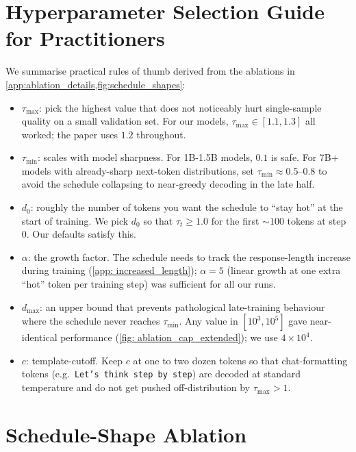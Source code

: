 {\section{Hyperparameter Selection Guide for Practitioners}
\label{sec:hp_guide}
We summarise practical rules of thumb derived from the ablations in
\cref{app:ablation_details,fig:schedule_shapes}:
\begin{itemize}
\item \textbf{$\tau_{\max}$}: pick the highest value that does not noticeably hurt single-sample quality on a small validation set. For our models, $\tau_{\max} \in [1.1, 1.3]$ all worked; the paper uses $1.2$ throughout.
\item \textbf{$\tau_{\min}$}: scales with model sharpness. For 1B-1.5B models, $0.1$ is safe. For 7B+ models with already-sharp next-token distributions, set $\tau_{\min} \approx 0.5\text{--}0.8$ to avoid the schedule collapsing to near-greedy decoding in the late half.
\item \textbf{$d_0$}: roughly the number of tokens you want the schedule to ``stay hot'' at the start of training. We pick $d_0$ so that $\tau_t \geq 1.0$ for the first $\sim 100$ tokens at step 0. Our defaults satisfy this.
\item \textbf{$\alpha$}: the growth factor. The schedule needs to track the response-length increase during training (\cref{app: increased_length}); $\alpha = 5$ (linear growth at one extra ``hot'' token per training step) was sufficient for all our runs.
\item \textbf{$d_{\max}$}: an upper bound that prevents pathological late-training behaviour where the schedule never reaches $\tau_{\min}$. Any value in $[10^3, 10^5]$ gave near-identical performance (\cref{fig: ablation_cap_extended}); we use $4{\times}10^4$.
\item \textbf{$c$}: template-cutoff. Keep $c$ at one to two dozen tokens so that chat-formatting tokens (e.g.\ \texttt{Let's think step by step}) are decoded at standard temperature and do not get pushed off-distribution by $\tau_{\max} > 1$.
\end{itemize}

\section{Schedule-Shape Ablation}
\label{app:schedule_shapes}

}
